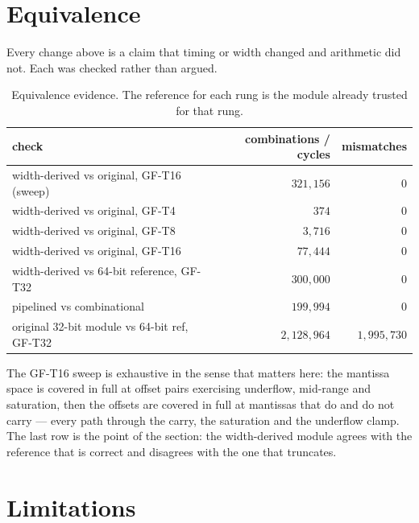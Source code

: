 \documentclass[11pt]{article}
\begin{document}
\section{Equivalence}\label{sec:equiv}

Every change above is a claim that timing or width changed and arithmetic did
not. Each was checked rather than argued.

\begin{table}[t]\centering
\caption{Equivalence evidence. The reference for each rung is the module already
trusted for that rung.}
\label{tab:equiv}
\begin{tabular}{lrr}
\toprule
check & combinations / cycles & mismatches \\
\midrule
width-derived vs original, GF-T16 (sweep)      & $321{,}156$   & $0$ \\
width-derived vs original, GF-T4               & $374$         & $0$ \\
width-derived vs original, GF-T8               & $3{,}716$     & $0$ \\
width-derived vs original, GF-T16              & $77{,}444$    & $0$ \\
width-derived vs 64-bit reference, GF-T32      & $300{,}000$   & $0$ \\
pipelined vs combinational                     & $199{,}994$   & $0$ \\
\midrule
original 32-bit module vs 64-bit ref, GF-T32   & $2{,}128{,}964$ & $1{,}995{,}730$ \\
\bottomrule
\end{tabular}
\end{table}

The GF-T16 sweep is exhaustive in the sense that matters here: the mantissa space
is covered in full at offset pairs exercising underflow, mid-range and
saturation, then the offsets are covered in full at mantissas that do and do not
carry --- every path through the carry, the saturation and the underflow clamp.
The last row is the point of the section: the width-derived module agrees with
the reference that is correct and disagrees with the one that truncates.

\section{Limitations}\label{sec:limits}
\end{document}
